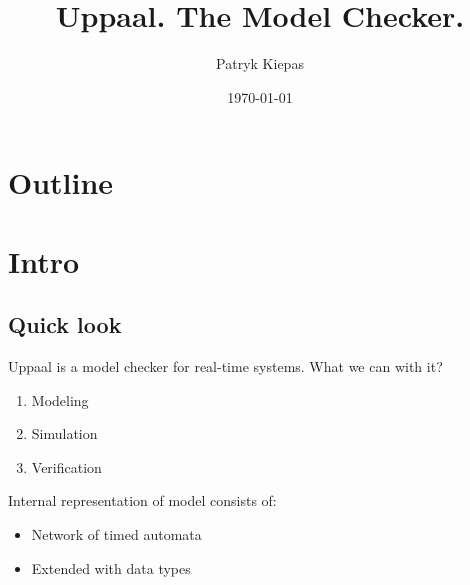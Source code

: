 \documentclass{beamer}
\title{Uppaal. The Model Checker.}
\author{Patryk Kiepas}
\date{\today}
\begin{document}
\begin{frame}
	\titlepage
\end{frame}

\section*{Outline}
\begin{frame}
	\tableofcontents
\end{frame}

\section{Intro}
\subsection{Quick look}
\begin{frame}
	Uppaal is a model checker for real-time systems. What we can with it?
	
	\begin{enumerate}
		\item Modeling
		\item Simulation
		\item Verification
	\end{enumerate}
	
	Internal representation of model consists of:
	
	\begin{itemize}
		\item Network of timed automata
		\item Extended with data types
	\end{itemize}

\end{frame}
\end{document}

